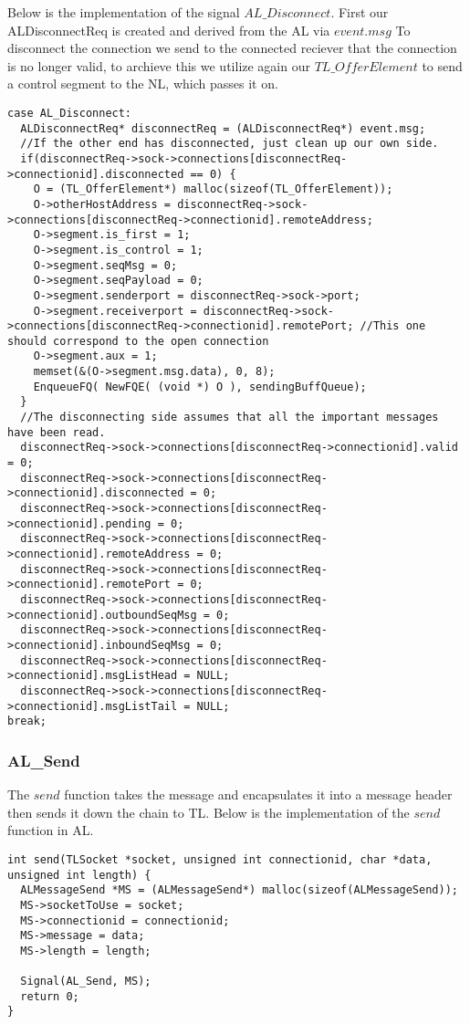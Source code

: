 Below is the implementation of the signal $AL\_Disconnect$.
First our ALDisconnectReq is created and derived from the AL via $event.msg$
To disconnect the connection we send to the connected reciever that the connection is no longer valid, to archieve this
we utilize again our $TL\_OfferElement$ to send a control segment to the NL, which passes it on.
\begin{lstlisting}
case AL_Disconnect:
  ALDisconnectReq* disconnectReq = (ALDisconnectReq*) event.msg;
  //If the other end has disconnected, just clean up our own side.
  if(disconnectReq->sock->connections[disconnectReq->connectionid].disconnected == 0) {
    O = (TL_OfferElement*) malloc(sizeof(TL_OfferElement));
    O->otherHostAddress = disconnectReq->sock->connections[disconnectReq->connectionid].remoteAddress;
    O->segment.is_first = 1;
    O->segment.is_control = 1;
    O->segment.seqMsg = 0;
    O->segment.seqPayload = 0;
    O->segment.senderport = disconnectReq->sock->port;
    O->segment.receiverport = disconnectReq->sock->connections[disconnectReq->connectionid].remotePort; //This one should correspond to the open connection
    O->segment.aux = 1;
    memset(&(O->segment.msg.data), 0, 8);
    EnqueueFQ( NewFQE( (void *) O ), sendingBuffQueue);
  }
  //The disconnecting side assumes that all the important messages have been read.
  disconnectReq->sock->connections[disconnectReq->connectionid].valid = 0;
  disconnectReq->sock->connections[disconnectReq->connectionid].disconnected = 0;
  disconnectReq->sock->connections[disconnectReq->connectionid].pending = 0;
  disconnectReq->sock->connections[disconnectReq->connectionid].remoteAddress = 0;
  disconnectReq->sock->connections[disconnectReq->connectionid].remotePort = 0;
  disconnectReq->sock->connections[disconnectReq->connectionid].outboundSeqMsg = 0;
  disconnectReq->sock->connections[disconnectReq->connectionid].inboundSeqMsg = 0;
  disconnectReq->sock->connections[disconnectReq->connectionid].msgListHead = NULL;
  disconnectReq->sock->connections[disconnectReq->connectionid].msgListTail = NULL;
break;
\end{lstlisting}

\subsubsection{AL\_Send}
The $send$ function takes the message and encapsulates it into a message header then sends it down the chain to TL.
Below is the implementation of the $send$ function in AL.
\begin{lstlisting}
int send(TLSocket *socket, unsigned int connectionid, char *data, unsigned int length) {
  ALMessageSend *MS = (ALMessageSend*) malloc(sizeof(ALMessageSend));
  MS->socketToUse = socket;
  MS->connectionid = connectionid;
  MS->message = data;
  MS->length = length;

  Signal(AL_Send, MS);
  return 0;
}
\end{lstlisting}

